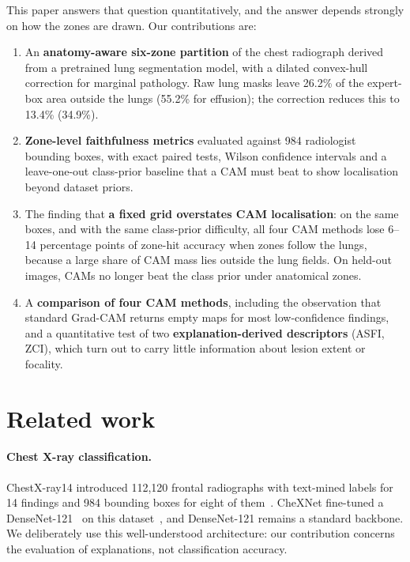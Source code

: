 \documentclass[pdflatex,sn-mathphys-num]{sn-jnl}
\begin{document}
This paper answers that question quantitatively, and the answer depends strongly on how the zones are drawn. Our contributions are:
\begin{enumerate}
\item An \textbf{anatomy-aware six-zone partition} of the chest radiograph derived from a pretrained lung segmentation model, with a dilated convex-hull correction for marginal pathology. Raw lung masks leave 26.2\% of the expert-box area outside the lungs (55.2\% for effusion); the correction reduces this to 13.4\% (34.9\%).
\item \textbf{Zone-level faithfulness metrics} evaluated against 984 radiologist bounding boxes, with exact paired tests, Wilson confidence intervals and a leave-one-out class-prior baseline that a CAM must beat to show localisation beyond dataset priors.
\item The finding that \textbf{a fixed grid overstates CAM localisation}: on the same boxes, and with the same class-prior difficulty, all four CAM methods lose 6--14 percentage points of zone-hit accuracy when zones follow the lungs, because a large share of CAM mass lies outside the lung fields. On held-out images, CAMs no longer beat the class prior under anatomical zones.
\item A \textbf{comparison of four CAM methods}, including the observation that standard Grad-CAM returns empty maps for most low-confidence findings, and a quantitative test of two \textbf{explanation-derived descriptors} (ASFI, ZCI), which turn out to carry little information about lesion extent or focality.
\end{enumerate}

\section{Related work}\label{sec:related}

\paragraph{Chest X-ray classification.} ChestX-ray14 introduced 112,120 frontal radiographs with text-mined labels for 14 findings and 984 bounding boxes for eight of them~\cite{wang2017chestxray8}. CheXNet fine-tuned a DenseNet-121~\cite{huang2017densenet} on this dataset~\cite{rajpurkar2017chexnet}, and DenseNet-121 remains a standard backbone. We deliberately use this well-understood architecture: our contribution concerns the evaluation of explanations, not classification accuracy.
\end{document}
